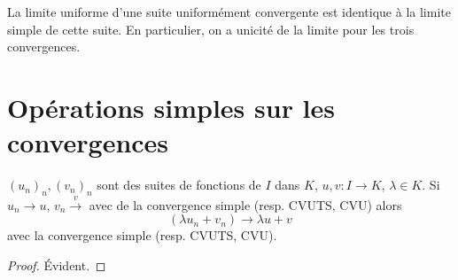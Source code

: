 \begin{rem}
    La limite uniforme d'une suite uniformément convergente est identique à la limite simple de cette suite. En particulier, on a unicité de la limite pour les trois convergences.
\end{rem}

\section{Opérations simples sur les convergences}

\begin{prop}
    \Hyp $(u_n)_n,(v_n)_n$ sont des suites de fonctions de $I$ dans $K$, $u,v:I\to K$, $\lambda\in K$.
    \Conc Si $u_n\xrightarrow{}u$, $v_n\xrightarrow v$ avec de la convergence simple (resp. CVUTS, CVU) alors \[
        (\lambda u_n+v_n)\xrightarrow{}\lambda u+v
    \]
    avec la convergence simple (resp. CVUTS, CVU).
\end{prop}

\begin{proof}
    Évident.
\end{proof}


